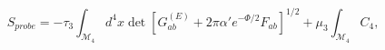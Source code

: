 \begin{equation} \label{BI}
S_{probe}=-\tau_3\int_{\mathcal{M}_4}d^4x
\det[G^{(E)}_{ab} + 2 \pi \alpha' e^{- \Phi/2} F_{ab}]^{1/2}
+ \mu_3\int_{\mathcal{M}_4} C_4,
\end{equation}

